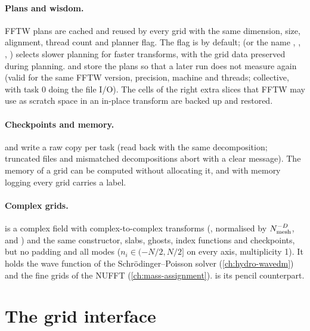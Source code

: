 \paragraph*{Plans and wisdom.} FFTW plans are cached and reused by every grid with the same dimension, size, alignment, thread
count and planner flag. The flag is  by default;  (or the name
, , , ) selects slower planning for faster transforms, with the grid
data preserved during planning.  and  store the plans so that a later run does not
measure again (valid for the same FFTW version, precision, machine and threads; collective, with task 0 doing the file I/O). The
cells of the right extra slices that FFTW may use as scratch space in an in-place transform are backed up and restored.

\paragraph*{Checkpoints and memory.}  and  write a raw copy per task (read back with the
same decomposition; truncated files and mismatched decompositions abort with a clear message). The memory of a grid can be
computed without allocating it, and with memory logging every grid carries a label.

\paragraph*{Complex grids.}  is a complex field with complex-to-complex transforms (,
normalised by $N_{\rm mesh}^{-D}$, and ) and the same constructor, slabs, ghosts, index functions and
checkpoints, but no padding and all modes ($n_i\in(-N/2,N/2]$ on every axis, multiplicity 1). It holds the wave function of
the Schrödinger--Poisson solver (\cref{ch:hydro-wavedm}) and the fine grids of the NUFFT (\cref{ch:mass-assignment}).
 is its pencil counterpart.

\section{The grid interface}\label{sec:grids-interface}

